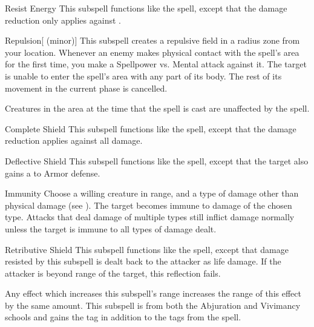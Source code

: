 \begin{ability}[\nth{1}]{Resist Energy}
This subspell functions like the  spell, except that the damage reduction only applies against .
\end{ability}
\vspace{0.25em}


\begin{ability}[\nth{2}]{Repulsion}[ (minor)]
This subspell creates a repulsive field in a \areamed radius zone from your location.
Whenever an enemy makes physical contact with the spell's area for the first time, you make a Spellpower vs. Mental attack against it.
\hit The target is unable to enter the spell's area with any part of its body.
The rest of its movement in the current phase is cancelled.

Creatures in the area at the time that the spell is cast are unaffected by the spell.
\end{ability}
\vspace{0.25em}


\begin{ability}[\nth{3}]{Complete Shield}
This subspell functions like the  spell, except that the damage reduction applies against all damage.
\end{ability}
\vspace{0.25em}


\begin{ability}[\nth{4}]{Deflective Shield}
This subspell functions like the  spell, except that the target also gains a   to Armor defense.
\end{ability}
\vspace{0.25em}


\begin{ability}[\nth{4}]{Immunity}
Choose a willing creature in \rngclose range, and a type of damage other than physical damage (see ).
The target becomes immune to damage of the chosen type.
Attacks that deal damage of multiple types still inflict damage normally unless the target is immune to all types of damage dealt.
\end{ability}
\vspace{0.25em}


\begin{ability}[\nth{4}]{Retributive Shield}
This subspell functions like the  spell, except that damage resisted by this subspell is dealt back to the attacker as life damage.
If the attacker is beyond \rngclose range of the target, this reflection fails.

Any effect which increases this subspell's range increases the range of this effect by the same amount.
This subspell is from both the Abjuration and Vivimancy schools and gains the  tag in addition to the tags from the  spell.
\end{ability}
\vspace{0.25em}


